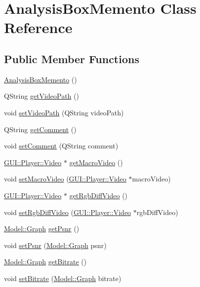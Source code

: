 \hypertarget{classMemento_1_1AnalysisBoxMemento}{}\section{Analysis\+Box\+Memento Class Reference}
\label{classMemento_1_1AnalysisBoxMemento}
\subsection*{Public Member Functions}
\begin{DoxyCompactItemize}
\item 
\hyperlink{classMemento_1_1AnalysisBoxMemento_a2891757dd897d8d7e04f6ac721863e30}{Analysis\+Box\+Memento} ()
\item 
Q\+String \hyperlink{classMemento_1_1AnalysisBoxMemento_a0aee21e65efbd5059679492dcb847281}{get\+Video\+Path} ()
\item 
void \hyperlink{classMemento_1_1AnalysisBoxMemento_a3db0ccff589bc23a3226a0ac59857437}{set\+Video\+Path} (Q\+String video\+Path)
\item 
Q\+String \hyperlink{classMemento_1_1AnalysisBoxMemento_a8475ee6c96bf1157aa07530f9100416c}{get\+Comment} ()
\item 
void \hyperlink{classMemento_1_1AnalysisBoxMemento_ab3a897eff60f58840c8d1b40292cf047}{set\+Comment} (Q\+String comment)
\item 
\hyperlink{classGUI_1_1Player_1_1Video}{G\+U\+I\+::\+Player\+::\+Video} $\ast$ \hyperlink{classMemento_1_1AnalysisBoxMemento_a4766ee11b86f10503824b3dc18ec3a6d}{get\+Macro\+Video} ()
\item 
void \hyperlink{classMemento_1_1AnalysisBoxMemento_ab43a2220425e3311fa978cebe61db3e4}{set\+Macro\+Video} (\hyperlink{classGUI_1_1Player_1_1Video}{G\+U\+I\+::\+Player\+::\+Video} $\ast$macro\+Video)
\item 
\hyperlink{classGUI_1_1Player_1_1Video}{G\+U\+I\+::\+Player\+::\+Video} $\ast$ \hyperlink{classMemento_1_1AnalysisBoxMemento_aeafaf51d6b8da8f5015d7887cf00c474}{get\+Rgb\+Diff\+Video} ()
\item 
void \hyperlink{classMemento_1_1AnalysisBoxMemento_a15413d63ffb3c5f97f39d3c2f11b5c0e}{set\+Rgb\+Diff\+Video} (\hyperlink{classGUI_1_1Player_1_1Video}{G\+U\+I\+::\+Player\+::\+Video} $\ast$rgb\+Diff\+Video)
\item 
\hyperlink{classModel_1_1Graph}{Model\+::\+Graph} \hyperlink{classMemento_1_1AnalysisBoxMemento_abe7002bc369445d950a091d3aaff2e3b}{get\+Psnr} ()
\item 
void \hyperlink{classMemento_1_1AnalysisBoxMemento_adb9a486711e0f4b61bf596cc749bcbe4}{set\+Psnr} (\hyperlink{classModel_1_1Graph}{Model\+::\+Graph} psnr)
\item 
\hyperlink{classModel_1_1Graph}{Model\+::\+Graph} \hyperlink{classMemento_1_1AnalysisBoxMemento_a309d723763c8ea7b860b79b203f14ce0}{get\+Bitrate} ()
\item 
void \hyperlink{classMemento_1_1AnalysisBoxMemento_a3a4987e46d417afa31c5e340942dfd80}{set\+Bitrate} (\hyperlink{classModel_1_1Graph}{Model\+::\+Graph} bitrate)
\end{DoxyCompactItemize}


